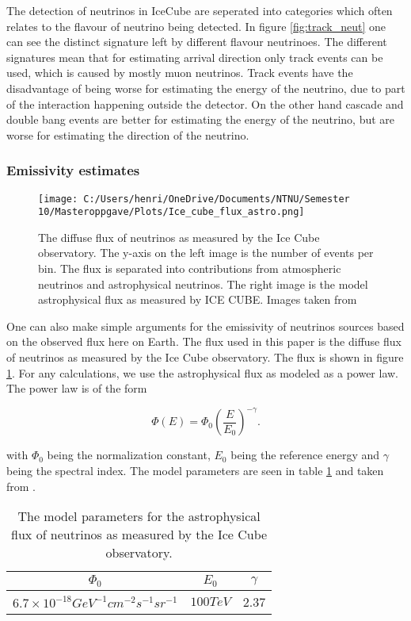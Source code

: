The detection of neutrinos in IceCube are seperated into categories which often relates to the flavour of neutrino being detected. In figure \ref{fig:track_neut} one can see the distinct signature left by different flavour neutrinoes. The different signatures mean that for estimating arrival direction only track events can be used, which is caused by mostly muon neutrinos. Track events have the disadvantage of being worse for estimating the energy of the neutrino, due to part of the interaction happening outside the detector. On the other hand cascade and double bang events are better for estimating the energy of the neutrino, but are worse for estimating the direction of the neutrino.


\subsubsection{Emissivity estimates}
\label{sec:emmisivity_neutrinos}

\begin{figure}[H]
    \centering
    \texttt{[image: C:/Users/henri/OneDrive/Documents/NTNU/Semester 10/Masteroppgave/Plots/Ice\_cube\_flux\_astro.png]}
    \caption{The diffuse flux of neutrinos as measured by the Ice Cube observatory. The y-axis on the left image is the number of events per bin.  The flux is separated into contributions from atmospheric neutrinos and astrophysical neutrinos. The right image is the model astrophysical flux as measured by ICE CUBE. Images taken from \cite{Abbasi_2022} }
    \label{fig:flux_neutrinos}
\end{figure}

One can also make simple arguments for the emissivity of  neutrinos sources based on the observed 
flux here on Earth. The flux used in this paper is the diffuse flux of neutrinos as measured by the Ice Cube observatory. The flux is shown in figure \ref{fig:flux_neutrinos}. 
For any calculations, we use the astrophysical flux as modeled as a power law. The power law is of the form 

\begin{equation}
    \Phi(E) = \Phi_0 \left(\frac{E}{E_0}\right)^{-\gamma}.
\end{equation}

with $\Phi_0$ being the normalization constant, $E_0$ being the reference energy and $\gamma$ being the spectral index. The model parameters are seen in table \ref{tab:neutrino_flux} and taken from \cite{Abbasi_2022}.

\begin{table}
    \centering
    \begin{tabular}{|c|c|c|}
        \hline
        $\Phi_0$ & $E_0$ & $\gamma$ \\
        \hline
        $6.7\times 10^{-18} GeV^{-1} cm^{-2} s^{-1} sr^{-1}$ & $100 TeV$ & 2.37 \\
        \hline
    \end{tabular}
    \caption{The model parameters for the astrophysical flux of neutrinos as measured by the Ice Cube observatory.}
    \label{tab:neutrino_flux}
\end{table}

